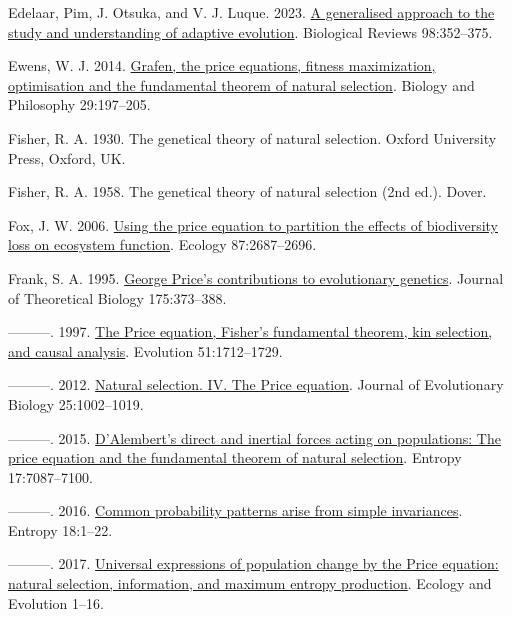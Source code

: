 \documentclass[
]{article}
\newlength{\cslhangindent}
\newenvironment{CSLReferences}[2] %
 {\begin{list}{}{%
  \setlength{\itemindent}{0pt}
  \setlength{\leftmargin}{0pt}
  \setlength{\parsep}{0pt}
  \ifodd #1
   \setlength{\leftmargin}{\cslhangindent}
   \setlength{\itemindent}{-1\cslhangindent}
  \fi
  \setlength{\itemsep}{#2\baselineskip}}}
 {\end{list}}
\begin{document}
\begin{CSLReferences}{1}{0}
Edelaar, Pim, J. Otsuka, and V. J. Luque. 2023.
\href{https://doi.org/10.1111/brv.12910}{{A generalised approach to the
study and understanding of adaptive evolution}}. Biological Reviews
98:352--375.

Ewens, W. J. 2014.
\href{https://doi.org/10.1007/s10539-013-9412-0}{Grafen, the price
equations, fitness maximization, optimisation and the fundamental
theorem of natural selection}. Biology and Philosophy 29:197--205.

Fisher, R. A. 1930. The genetical theory of natural selection. Oxford
University Press, Oxford, UK.

Fisher, R. A. 1958. The genetical theory of natural selection (2nd ed.).
Dover.

Fox, J. W. 2006.
\href{https://doi.org/10.1890/0012-9658(2006)87\%5B2687:utpetp\%5D2.0.co;2}{{Using
the price equation to partition the effects of biodiversity loss on
ecosystem function}}. Ecology 87:2687--2696.

Frank, S. A. 1995. \href{https://doi.org/10.1006/jtbi.1995.0148}{{George
Price's contributions to evolutionary genetics}}. Journal of Theoretical
Biology 175:373--388.

---------. 1997.
\href{https://doi.org/10.1111/j.1558-5646.1997.tb05096.x}{{The Price
equation, Fisher's fundamental theorem, kin selection, and causal
analysis}}. Evolution 51:1712--1729.

---------. 2012.
\href{https://doi.org/10.1111/j.1420-9101.2012.02498.x}{{Natural
selection. IV. The Price equation}}. Journal of Evolutionary Biology
25:1002--1019.

---------. 2015. \href{https://doi.org/10.3390/e17107087}{{D'Alembert's
direct and inertial forces acting on populations: The price equation and
the fundamental theorem of natural selection}}. Entropy 17:7087--7100.

---------. 2016. \href{https://doi.org/10.3390/e18050192}{{Common
probability patterns arise from simple invariances}}. Entropy 18:1--22.

---------. 2017. \href{https://doi.org/10.1002/ece3.2922}{{Universal
expressions of population change by the Price equation: natural
selection, information, and maximum entropy production}}. Ecology and
Evolution 1--16.


\end{CSLReferences}
\end{document}
